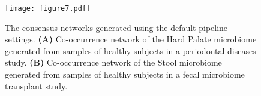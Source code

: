   \begin{figure}[h]
    \centering
    \texttt{[image: figure7.pdf]}
    \caption{
      The consensus networks generated using the default pipeline settings.
      \textbf{(A)} Co-occurrence network of the Hard Palate microbiome generated from samples of healthy subjects in a periodontal diseases study.
      \textbf{(B)} Co-occurrence network of the Stool microbiome generated from samples of healthy subjects in a fecal microbiome transplant study.
  }
    \label{fig:figure7}
  \end{figure}
